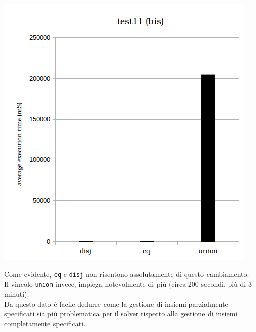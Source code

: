 \begin{center}
\includegraphics[scale=0.8]{images/histogram_test11bis.png}
\end{center}

Come evidente, \texttt{eq} e \texttt{disj} non risentono assolutamente di questo cambiamento.\\
Il vincolo \texttt{union} invece, impiega notevolmente di più (circa 200 secondi, più di 3 minuti).\\
Da questo dato è facile dedurre come la gestione di insiemi parzialmente specificati sia più problematica per il solver rispetto alla gestione di insiemi completamente specificati.\\


